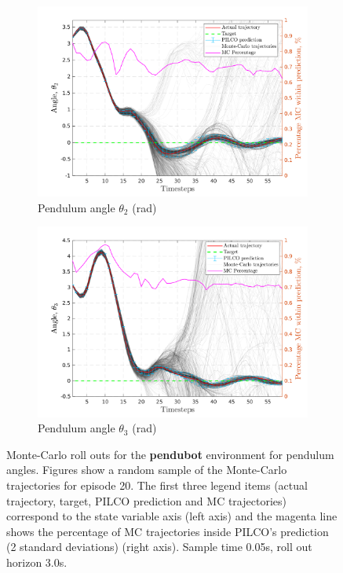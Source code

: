  
\begin{figure}[htp!]    
   \begin{subfigure}[b]{1\linewidth}
    \centering
    \includegraphics[height=0.4\textheight,width=1\textwidth]{Chapter3/Figures/pen_MC_rollout_Ep_40_Dim_3.png} 
    \caption{Pendulum angle $\theta_2$ (rad)} 
    \label{Fig:Re-pen-pen-velocity} 
  \end{subfigure} 
  \hspace{\fill}
  \begin{subfigure}[b]{1\linewidth}
    \centering
    \includegraphics[height=0.4\textheight,width=1\textwidth]{Chapter3/Figures/pen_MC_rollout_Ep_40_Dim_4.png} 
    \caption{Pendulum angle $\theta_3$ (rad)} 
    \label{Fig:Re-pen-pen-angle} 
  \end{subfigure} 

\caption[Monte-Carlo roll outs for \textbf{pendubot} pendulum angles]{Monte-Carlo roll outs for the \textbf{pendubot} environment for pendulum angles. Figures show a random sample of the Monte-Carlo trajectories for episode 20. The first three legend items (actual trajectory, target, PILCO prediction and MC trajectories) correspond to the state variable axis (left axis) and the magenta line shows the percentage of MC trajectories inside PILCO's prediction (2 standard deviations) (right axis). Sample time 0.05s, roll out horizon 3.0s.}
\label{Fig:Re-pen-MC-roll-outs-2} 
\end{figure}
 
